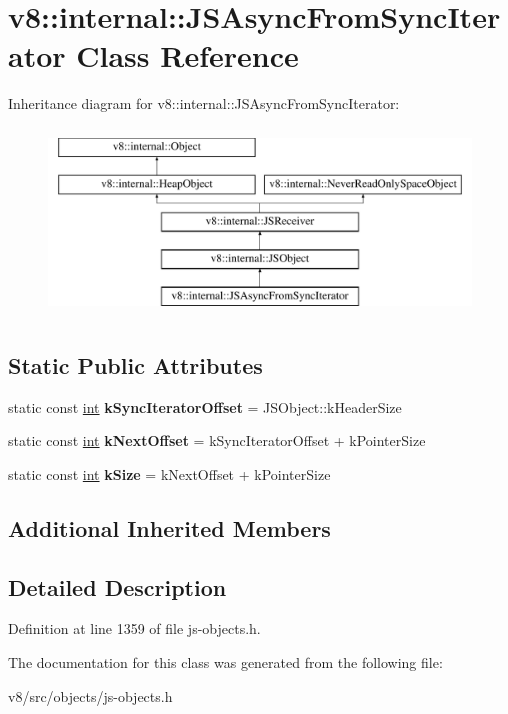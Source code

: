 \hypertarget{classv8_1_1internal_1_1JSAsyncFromSyncIterator}{}\section{v8\+:\+:internal\+:\+:J\+S\+Async\+From\+Sync\+Iterator Class Reference}
\label{classv8_1_1internal_1_1JSAsyncFromSyncIterator}
Inheritance diagram for v8\+:\+:internal\+:\+:J\+S\+Async\+From\+Sync\+Iterator\+:\begin{figure}[H]
\begin{center}
\leavevmode
\includegraphics[height=5.000000cm]{classv8_1_1internal_1_1JSAsyncFromSyncIterator}
\end{center}
\end{figure}
\subsection*{Static Public Attributes}
\begin{DoxyCompactItemize}
\item 
\mbox{\label{classv8_1_1internal_1_1JSAsyncFromSyncIterator_a059c83a967d156c0457e148b95974d5b}} 
static const \mbox{\hyperlink{classint}{int}} {\bfseries k\+Sync\+Iterator\+Offset} = J\+S\+Object\+::k\+Header\+Size
\item 
\mbox{\label{classv8_1_1internal_1_1JSAsyncFromSyncIterator_a3b1028d41f252f4e8eee64183eec06f7}} 
static const \mbox{\hyperlink{classint}{int}} {\bfseries k\+Next\+Offset} = k\+Sync\+Iterator\+Offset + k\+Pointer\+Size
\item 
\mbox{\label{classv8_1_1internal_1_1JSAsyncFromSyncIterator_adef8e5c9bed0d525f9cef655736eec87}} 
static const \mbox{\hyperlink{classint}{int}} {\bfseries k\+Size} = k\+Next\+Offset + k\+Pointer\+Size
\end{DoxyCompactItemize}
\subsection*{Additional Inherited Members}


\subsection{Detailed Description}


Definition at line 1359 of file js-\/objects.\+h.



The documentation for this class was generated from the following file\+:\begin{DoxyCompactItemize}
\item 
v8/src/objects/js-\/objects.\+h\end{DoxyCompactItemize}
